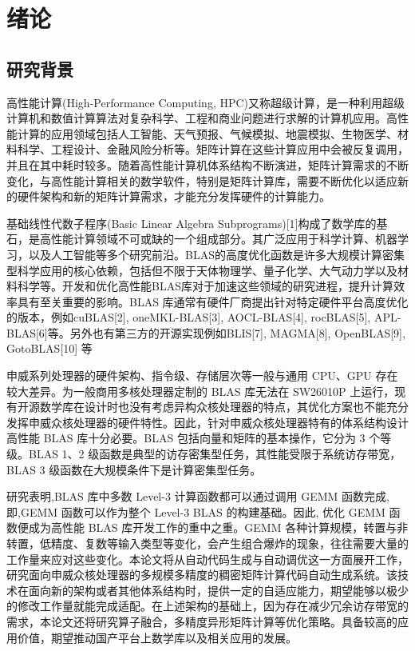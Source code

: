 \chapter{绪论}\label{chap:introduction}

\section{研究背景}


高性能计算(High-Performance Computing, HPC)又称超级计算，是一种利用超级计算机和数值计算算法对复杂科学、工程和商业问题进行求解的计算机应用。高性能计算的应用领域包括人工智能、天气预报、气候模拟、地震模拟、生物医学、材料科学、工程设计、金融风险分析等。矩阵计算在这些计算应用中会被反复调用，并且在其中耗时较多。随着高性能计算机体系结构不断演进，矩阵计算需求的不断变化，与高性能计算相关的数学软件，特别是矩阵计算库，需要不断优化以适应新的硬件架构和新的矩阵计算需求，才能充分发挥硬件的计算能力。

基础线性代数子程序(Basic Linear Algebra Subprograms)[1]构成了数学库的基石，是高性能计算领域不可或缺的一个组成部分。其广泛应用于科学计算、机器学习，以及人工智能等多个研究前沿。BLAS的高度优化函数是许多大规模计算密集型科学应用的核心依赖，包括但不限于天体物理学、量子化学、大气动力学以及材料科学等。开发和优化高性能BLAS库对于加速这些领域的研究进程，提升计算效率具有至关重要的影响。BLAS 库通常有硬件厂商提出针对特定硬件平台高度优化的版本，例如cuBLAS[2], oneMKL-BLAS[3], AOCL-BLAS[4], rocBLAS[5], APL-BLAS[6]等。另外也有第三方的开源实现例如BLIS[7], MAGMA[8], OpenBLAS[9], GotoBLAS[10] 等

申威系列处理器的硬件架构、指令级、存储层次等一般与通用 CPU、GPU 存在较大差异。为一般商用多核处理器定制的 BLAS 库无法在 SW26010P 上运行，现有开源数学库在设计时也没有考虑异构众核处理器的特点，其优化方案也不能充分发挥申威众核处理器的硬件特性。因此，针对申威众核处理器特有的体系结构设计高性能 BLAS 库十分必要。BLAS 包括向量和矩阵的基本操作，它分为 3 个等级。BLAS 1、2 级函数是典型的访存密集型任务，其性能受限于系统访存带宽，BLAS 3 级函数在大规模条件下是计算密集型任务。

研究表明,BLAS 库中多数 Level-3 计算函数都可以通过调用 GEMM 函数完成, 即,GEMM 函数可以作为整个 Level-3 BLAS 的构建基础。因此, 优化 GEMM 函数便成为高性能 BLAS 库开发工作的重中之重。GEMM 各种计算规模，转置与非转置，低精度、复数等输入类型等变化，会产生组合爆炸的现象，往往需要大量的工作量来应对这些变化。本论文将从自动代码生成与自动调优这一方面展开工作，研究面向申威众核处理器的多规模多精度的稠密矩阵计算代码自动生成系统。该技术在面向新的架构或者其他体系结构时，提供一定的自适应能力，期望能够以极少的修改工作量就能完成适配。在上述架构的基础上，因为存在减少冗余访存带宽的需求，本论文还将研究算子融合，多精度异形矩阵计算等优化策略。具备较高的应用价值，期望推动国产平台上数学库以及相关应用的发展。

